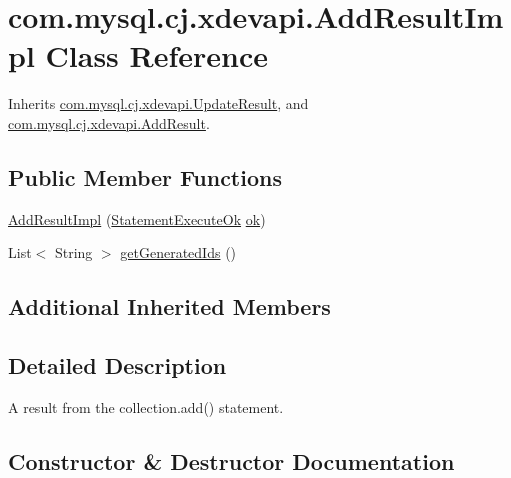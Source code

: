 \hypertarget{classcom_1_1mysql_1_1cj_1_1xdevapi_1_1_add_result_impl}{}\section{com.\+mysql.\+cj.\+xdevapi.\+Add\+Result\+Impl Class Reference}
\label{classcom_1_1mysql_1_1cj_1_1xdevapi_1_1_add_result_impl}


Inherits \mbox{\hyperlink{classcom_1_1mysql_1_1cj_1_1xdevapi_1_1_update_result}{com.\+mysql.\+cj.\+xdevapi.\+Update\+Result}}, and \mbox{\hyperlink{interfacecom_1_1mysql_1_1cj_1_1xdevapi_1_1_add_result}{com.\+mysql.\+cj.\+xdevapi.\+Add\+Result}}.

\subsection*{Public Member Functions}
\begin{DoxyCompactItemize}
\item 
\mbox{\hyperlink{classcom_1_1mysql_1_1cj_1_1xdevapi_1_1_add_result_impl_a3d93550eca35d5f57f713855afad2149}{Add\+Result\+Impl}} (\mbox{\hyperlink{classcom_1_1mysql_1_1cj_1_1protocol_1_1x_1_1_statement_execute_ok}{Statement\+Execute\+Ok}} \mbox{\hyperlink{classcom_1_1mysql_1_1cj_1_1xdevapi_1_1_update_result_a9314dbffc186019112194b43a86e0174}{ok}})
\item 
List$<$ String $>$ \mbox{\hyperlink{classcom_1_1mysql_1_1cj_1_1xdevapi_1_1_add_result_impl_a61db638035bc38725440e27d51dc1ef8}{get\+Generated\+Ids}} ()
\end{DoxyCompactItemize}
\subsection*{Additional Inherited Members}


\subsection{Detailed Description}
A result from the collection.\+add() statement. 

\subsection{Constructor \& Destructor Documentation}
\mbox{\label{classcom_1_1mysql_1_1cj_1_1xdevapi_1_1_add_result_impl_a3d93550eca35d5f57f713855afad2149}} 
